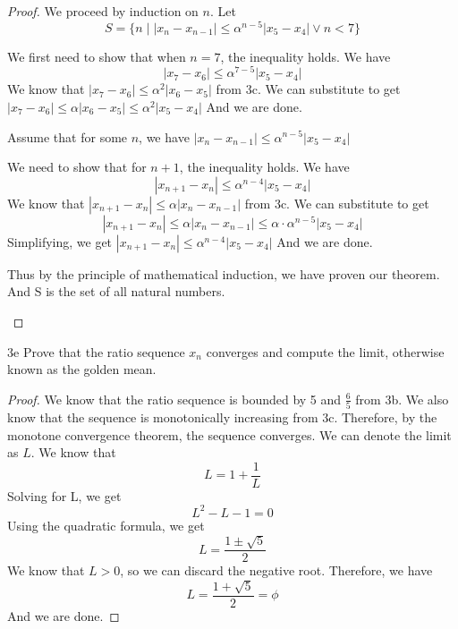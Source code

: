 \documentclass[boxes]{rutgers_hw}
\begin{document}
\begin{exern}{3}
    \begin{proof}
      We proceed by induction on $n$. 
      Let \[S = \{n \mid |x_n - x_{n-1}| \le {\alpha}^{n-5}|x_{5} - x_{4}| \lor n < 7\}\]
      \begin{induction}
        \begin{basecase}
          We first need to show that when $n = 7$, the inequality holds. We have
          \[ |x_7 - x_6| \le {\alpha}^{7-5}|x_{5} - x_{4}| \]
          We know that $|x_7 - x_6| \le {\alpha}^{2}|x_{6} - x_{5}|$ from 3c. We can substitute to get
          $ |x_7 - x_6| \le {\alpha}|x_{6} - x_{5}| \le {\alpha}^{2}|x_{5} - x_{4}| $
          And we are done.
        \end{basecase}
        \begin{indhyp}
          Assume that for some $n$, we have
          $ |x_n - x_{n-1}| \le {\alpha}^{n-5}|x_{5} - x_{4}| $
        \end{indhyp}
        \begin{indstep}
          We need to show that for $n+1$, the inequality holds. We have
          \[ |x_{n+1} - x_{n}| \le {\alpha}^{n-4}|x_{5} - x_{4}| \]
          We know that $|x_{n+1} - x_{n}| \le {\alpha}|x_{n} - x_{n-1}|$ from 3c. We can substitute to get
          \[ |x_{n+1} - x_{n}| \le {\alpha}|x_{n} - x_{n-1}| \le {\alpha} \cdot {\alpha}^{n-5}|x_{5} - x_{4}| \]
          Simplifying, we get
          $ |x_{n+1} - x_{n}| \le {\alpha}^{n-4}|x_{5} - x_{4}| $
          And we are done.
        \end{indstep}
        Thus by the principle of mathematical induction, we have proven our theorem. And S is the set of all natural numbers.
      \end{induction}
    \end{proof}
    
  \end{exern}
  
  \begin{exern}{3e}
    Prove that the ratio sequence $x_n$ converges and compute the limit, otherwise known as the golden mean.
  \end{exern}
  \begin{proof}
    We know that the ratio sequence is bounded by 5 and $\frac65$ from 3b. We also know that the sequence is monotonically increasing from 3c. Therefore, by the monotone convergence theorem, the sequence converges. We can denote the limit as $L$. We know that
    \[ L = 1 + \frac1L \]
    Solving for L, we get
    \[ L^2 - L - 1 = 0 \]
    Using the quadratic formula, we get
    \[ L = \frac{1 \pm \sqrt{5}}{2} \]
    We know that $L > 0$, so we can discard the negative root. Therefore, we have
    \[ L = \frac{1 + \sqrt{5}}{2} = \phi \]
    And we are done.
  \end{proof}
  
\end{document}
